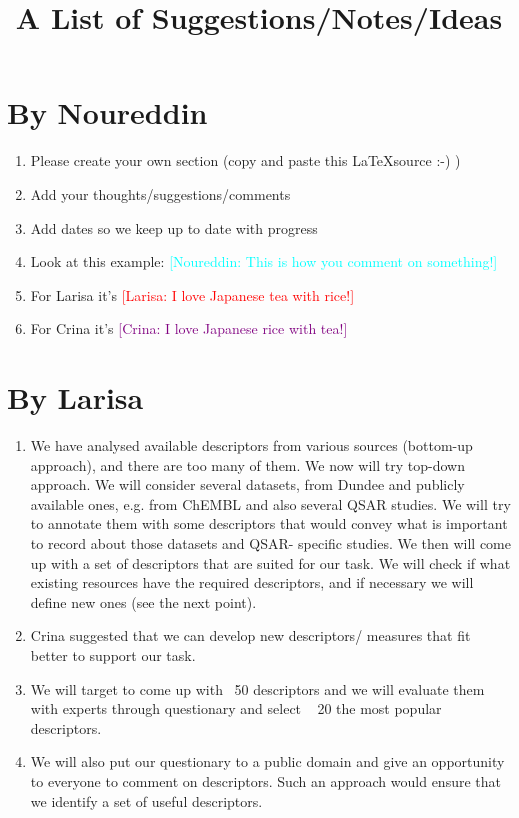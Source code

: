 \documentclass[a4paper,12pt, english]{article}
\newcommand{\kibitz}[2]{\ifnum\Comments=1\textcolor{#1}{#2}\fi}
\newcommand{\ls}[1]{\kibitz{red}      {[Larisa: #1]}}
\newcommand{\cg}[1]  {\kibitz{purple}   {[Crina: #1]}}
\newcommand{\ns}[1]{\kibitz{cyan}     {[Noureddin: #1]}}
\begin{document}
\title{A List of Suggestions/Notes/Ideas}

\large
\section{By Noureddin}
\begin{enumerate}
	\item Please create your own section (copy and paste this \LaTeX  source :-) )
	\item Add your thoughts/suggestions/comments
	\item Add dates so we keep up to date with progress
	\item Look at this example: \ns{This is how you comment on something!}
	\item For Larisa it's \ls{I love Japanese tea with rice!}
	\item For Crina it's  \cg{I love Japanese rice with tea!}
\end{enumerate}    

\section{By Larisa}
\begin{enumerate}
	\item We have analysed available descriptors from various sources (bottom-up approach), and there are too many of them. We now will try top-down approach. We will consider several datasets, from Dundee and publicly available ones, e.g. from ChEMBL and also several QSAR studies. We will try to annotate them with some descriptors that would convey what is important to record about those datasets and QSAR- specific studies. We then will come up with a set of descriptors that are suited for our task. We will check if what existing resources have the required descriptors, and if necessary we will define new ones (see the next point).
	\item Crina suggested that we can develop new descriptors/ measures that fit better to support our task.
	\item We will target to come up with ~50 descriptors and we will evaluate them with experts through questionary and select  ~ 20 the most popular descriptors.
	\item We will also put our questionary to a public domain and give an opportunity to everyone to comment on descriptors. Such an approach would ensure that we identify a set of useful descriptors.
\end{enumerate}  
\end{document}
